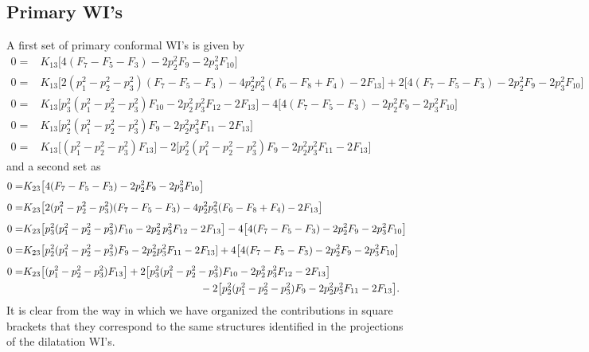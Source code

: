\documentclass[a4paper,11pt,openright,twoside]{book}
\numberwithin{equation}{section}
\begin{document}
{{\subsection{Primary WI's}
A first set of primary conformal WI's is given by
\begin{subequations}
	\begin{align}
		0=&K_{13}\big[ 4(F_7-F_5-F_3)-2p_2^2F_9-2p_3^2F_{10}\big]\\[1ex]
		0=&K_{13}\big[2(p_1^2-p_2^2-p_3^2)(F_7-F_5-F_3)-4p_2^2p_3^2(F_6-F_8+F_4)-2F_{13}\big]+2\big[ 4(F_7-F_5-F_3)-2p_2^2F_9-2p_3^2F_{10}\big]\\[1ex]
		0=&K_{13}\big[p_3^2(p_1^2-p_2^2-p_3^2)F_{10}-2p_2^2\,p_3^2 F_{12}-2F_{13}\big]-4\big[ 4(F_7-F_5-F_3)-2p_2^2F_9-2p_3^2F_{10}\big]\\[1ex]
		0=&K_{13}\big[p_2^2(p_1^2-p_2^2-p_3^2)F_9-2p_2^2p_3^2F_{11}-2F_{13}]\\[1ex]
		0=&K_{13}\big[(p_1^2-p_2^2-p_3^2)F_{13}\big]-2\big[p_2^2(p_1^2-p_2^2-p_3^2)F_9-2p_2^2p_3^2F_{11}-2F_{13}\big]
	\end{align}
\end{subequations}
and a second set as
\begin{subequations}
	\begin{align}
		0=&K_{23}\big[ 4(F_7-F_5-F_3)-2p_2^2F_9-2p_3^2F_{10}\big]\\[1ex]
		0=&K_{23}\big[2(p_1^2-p_2^2-p_3^2)(F_7-F_5-F_3)-4p_2^2p_3^2(F_6-F_8+F_4)-2F_{13}\big]\\[1ex]
		0=&K_{23}\big[p_3^2(p_1^2-p_2^2-p_3^2)F_{10}-2p_2^2\,p_3^2 F_{12}-2F_{13}\big]-4\big[ 4(F_7-F_5-F_3)-2p_2^2F_9-2p_3^2F_{10}\big]\\[1ex]
		0=&K_{23}\big[p_2^2(p_1^2-p_2^2-p_3^2)F_9-2p_2^2p_3^2F_{11}-2F_{13}]+4\big[ 4(F_7-F_5-F_3)-2p_2^2F_9-2p_3^2F_{10}\big]\\[1ex]
		0=&K_{23}\big[(p_1^2-p_2^2-p_3^2)F_{13}\big]+2\big[p_3^2(p_1^2-p_2^2-p_3^2)F_{10}-2p_2^2\,p_3^2 F_{12}-2F_{13}\big]\notag\\
		&\hspace{6cm}-2\big[p_2^2(p_1^2-p_2^2-p_3^2)F_9-2p_2^2p_3^2F_{11}-2F_{13}\big].
	\end{align}
\end{subequations}
It is clear from the way in which we have organized the contributions in square brackets that they correspond to the same structures identified in the projections of the dilatation WI's. 
}}
\end{document}
